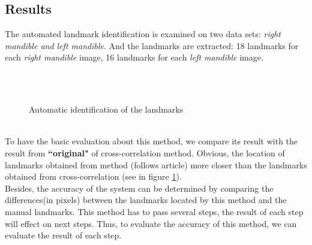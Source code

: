 \subsection{Results}
The automated landmark identification is examined on two data sets: \textit{right mandible and left mandible}. And the landmarks are extracted: 18 landmarks for each \textit{right mandible} image, 16 landmarks for each \textit{left mandible} image.\\
\begin{figure}[h!]
\centering
{}\\
~~
\caption{Automatic identification of the landmarks}
\label{fig:46}
\end{figure}~\\
To have the basic evaluation about this method, we compare its result with the result from \textbf{``original"} of cross-correlation method. Obvious, the location of landmarks obtained from method (follows article) more closer than the landmarks obtained from cross-correlation (see in figure \ref{fig:46}).\\
Besides, the accuracy of the system can be determined by comparing the differences(in pixels) between the landmarks located by this method and the manual landmarks. This method has to pass several steps, the result of each step will effect on next steps. Thus, to evaluate the accuracy of this method, we can evaluate the result of each step.
